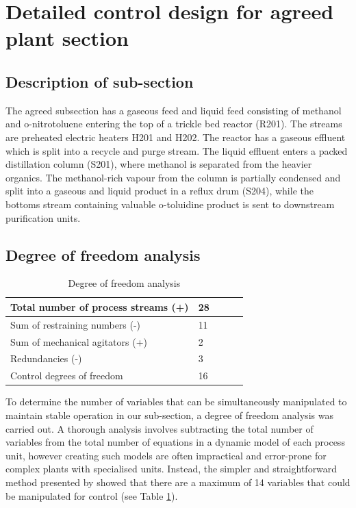 \section{Detailed control design for agreed plant section}
\label{sec:subsec}

\subsection{Description of sub-section}
The agreed subsection has a gaseous  feed and liquid feed consisting of methanol and o-nitrotoluene entering the top of a trickle bed reactor (R201). The streams are preheated electric heaters H201 and H202. The reactor has a gaseous effluent which is split into a recycle and purge stream. The liquid effluent enters a packed distillation column (S201), where methanol is separated from the heavier organics. The methanol-rich vapour from the column is partially condensed and split into a gaseous and liquid product in a reflux drum (S204), while the bottoms stream containing valuable o-toluidine product is sent to downstream purification units.

\subsection{Degree of freedom analysis}

\begin{table}
\centering
    \caption{Degree of freedom analysis}
    \label{tab:dof}
\begin{tabular}{@{}lllll@{}}
\toprule
Total number of process streams (+) & 28 &  &  &  \\ \midrule
Sum of restraining numbers (-)      & 11 &  &  &  \\
Sum of mechanical agitators (+)     & 2  &  &  &  \\
Redundancies (-)                    & 3  &  &  &  \\
Control degrees of freedom          & 16 &  &  &  \\ \bottomrule
\end{tabular}
\end{table}

To determine the number of variables that can be simultaneously manipulated to maintain stable operation in our sub-section, a degree of freedom analysis was carried out. A thorough analysis involves subtracting the total number of variables from the total number of equations in a dynamic model of each process unit, however creating such models are often impractical and error-prone for complex plants with specialised units. Instead, the simpler and straightforward method presented by \textcite{} showed that there are a maximum of 14 variables that could be manipulated for control (see Table \ref{tab:dof}).

